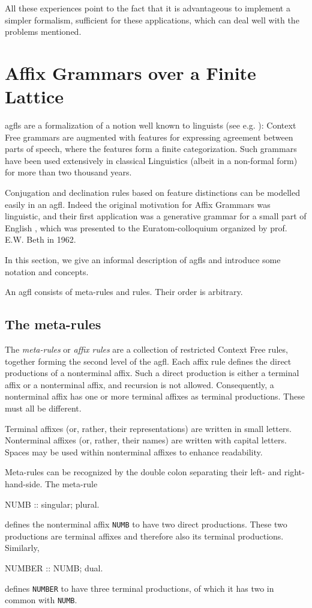 All these experiences point to the fact that it is advantageous to
implement a simpler formalism, sufficient for these applications,
which can deal well with the problems mentioned.

\section{Affix Grammars over a Finite Lattice}
{\sc agfl}s are a formalization of a notion well known to linguists
(see e.g. \cite{krulee:compprocnatlan}):
Context Free grammars are augmented with features for expressing agreement
between parts of speech, where the features form a finite categorization.
Such grammars have been used extensively in classical Linguistics
(albeit in a non-formal form) for more than two thousand years.

Conjugation and declination rules based on feature
distinctions can be modelled easily in an {\sc agfl}.
Indeed the original motivation for Affix Grammars was linguistic,
and their first application was a generative grammar for a small
part of English \cite{meko}, which was presented to the
Euratom-colloquium organized by prof. E.W. Beth in 1962.

In this section, we give an informal description of {\sc agfl}s and introduce
some notation and concepts.

An {\sc agfl} consists of meta-rules and rules. Their order is arbitrary.
\subsection{The meta-rules}
The {\em meta-rules} or {\em affix rules} are a collection of restricted
Context Free
rules, together forming the second level of the {\sc agfl}. Each affix rule
defines the direct productions of a nonterminal affix.
Such a direct production is either a terminal affix or a nonterminal affix, and
recursion is not allowed. Consequently, a nonterminal affix has one or more
terminal affixes as terminal productions. These must all be different.

Terminal affixes (or, rather, their representations) are written in small
letters.
Nonterminal affixes (or, rather, their names) are written with capital letters.
Spaces may be used within nonterminal affixes to enhance readability.

Meta-rules can be recognized by the double colon separating their left-
and right-hand-side. The meta-rule
\begin{elan}
NUMB :: singular; plural.
\end{elan}
\noindent
defines the nonterminal affix {\tt NUMB} to have two direct productions.
These two productions are terminal affixes and therefore also its terminal
productions. Similarly,
\begin{elan}
NUMBER :: NUMB; dual.
\end{elan}
\noindent
defines {\tt NUMBER} to have three terminal productions, of which it has
two in common with {\tt NUMB}.

